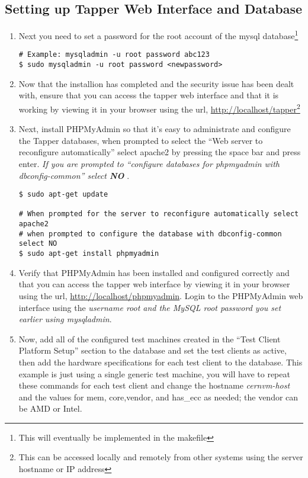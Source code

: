 \newpage
\subsection{Setting up Tapper Web Interface and Database}
\begin{enumerate}
\item 	Next you need to set a password for the root account of the mysql database\footnote{This will eventually be implemented in the 
		makefile}

\lstset{language=bash,caption= Set MySQL Root Password}
\begin{lstlisting}
# Example: mysqladmin -u root password abc123
$ sudo mysqladmin -u root password <newpassword>
\end{lstlisting}

\item 	Now that the installion has completed and the security issue has been dealt with, ensure that you can access the tapper web
		interface and that it is working by viewing it in your browser using the url, \url{http://localhost/tapper}\footnote{This can be accessed
		locally and remotely from other systems using the server hostname or IP address}

\item 	Next, install PHPMyAdmin so that it's easy to administrate and configure the Tapper databases, when prompted to select the
		``Web server to reconfigure automatically'' select apache2 by pressing the space bar and press enter. \emph{If you are 
		prompted to ``configure databases for phpmyadmin with dbconfig-common'' select {\bf NO} }.

\lstset{language=bash,caption= Install PHPMyAdmin}
\begin{lstlisting}
$ sudo apt-get update

# When prompted for the server to reconfigure automatically select apache2
# when prompted to configure the database with dbconfig-common select NO
$ sudo apt-get install phpmyadmin
\end{lstlisting}

\item	Verify that PHPMyAdmin has been installed and configured correctly and that you can access the tapper web
		interface by viewing it in your browser using the url, \url{http://localhost/phpmyadmin}. Login to the PHPMyAdmin
		web interface using the \emph{username root and the MySQL root password you set earlier using mysqladmin}.

\item 	Now, add all of the configured test machines created in the ``Test Client Platform Setup'' section to the
		\tapper database and set the test clients as active, then add the hardware specifications for each test client
		to the database. This example is just using a single generic test machine, you will have to repeat these commands
		for each test client and change the hostname \emph{cernvm-host} and the values for mem, core,vendor, and has\_ecc 
		as needed; the vendor can be AMD or Intel.
		

\end{enumerate}
